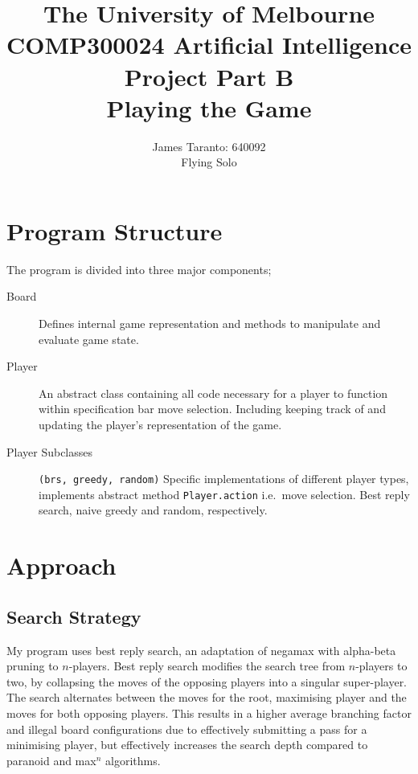 \documentclass[a4paper,10pt,draft]{article}
\title{
	{\small
	The University of Melbourne\\
	COMP300024 Artificial Intelligence\\[0.2em]
	}
    Project Part B\\[0.2em]
    \small Playing the Game\\
}
\author{
    James Taranto: 640092\\Flying Solo
}
\begin{document}
\maketitle
\section{Program Structure}
The program is divided into three major components;
\begin{description}
	\item[Board] Defines internal game representation and methods to manipulate and evaluate game state.
	\item[Player] An abstract class containing all code necessary for a player to function within specification bar move selection. Including keeping track of and updating the player's representation of the game.
	\item[Player Subclasses] \texttt{(brs, greedy, random)} Specific implementations of different player types, implements abstract method \texttt{Player.action} i.e.\ move selection. Best reply search, naive greedy and random, respectively. 
\end{description} 
\section{Approach}
\subsection{Search Strategy}
My program uses best reply search,\cite{schadd2011best} an adaptation of negamax with alpha-beta pruning to $n$-players. Best reply search modifies the search tree from $n$-players to two, by collapsing the moves of the opposing players into a singular super-player. The search alternates between the moves for the root, maximising player and the moves for both opposing players. This results in a higher average branching factor and illegal board configurations due to effectively submitting a pass for a minimising player, but effectively increases the search depth compared to paranoid and max$^n$ algorithms.
\end{document}
